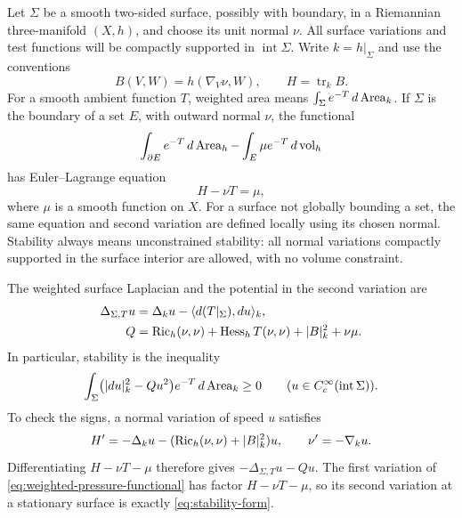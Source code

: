Let $\Sigma$ be a smooth two-sided surface, possibly with boundary, in a
Riemannian three-manifold $(X,h)$, and choose its unit normal $\nu$.
All surface variations and test functions will be compactly supported
in $\operatorname{int}\Sigma$.  Write $k=h|_\Sigma$ and use
the conventions
\[
 B(V,W)=h(\nabla_V\nu,W),\qquad H=\operatorname{tr}_k B.
\]
For a smooth ambient function $T$, weighted area means
$\int_\Sigma e^{-T}\,d\operatorname{Area}_k$.  If $\Sigma$ is the boundary of a set
$E$, with outward normal $\nu$, the functional
\begin{equation}\label{eq:weighted-pressure-functional}
 \int_{\partial E}e^{-T}\,d\operatorname{Area}_h
 -\int_E\mu e^{-T}\,d\operatorname{vol}_h
\end{equation}
has Euler--Lagrange equation
\begin{equation}\label{eq:weighted-mean-curvature}
 H-\nu T=\mu,
\end{equation}
where $\mu$ is a smooth function on $X$.  For a surface not globally
bounding a set, the same equation and second variation are defined
locally using its chosen normal.  Stability always means unconstrained
stability: all normal variations compactly supported in the surface
interior are allowed, with no volume constraint.

The weighted surface Laplacian and the potential in the second variation
are
\begin{equation}\label{eq:weighted-jacobi}
 \begin{split}
 \Delta_{\Sigma,T}u
   &=\Delta_ku-\langle d(T|_\Sigma),du\rangle_k,\\
 Q&=\operatorname{Ric}_h(\nu,\nu)+\operatorname{Hess}_hT(\nu,\nu)+|B|_k^2+\nu\mu.
 \end{split}
\end{equation}
In particular, stability is the inequality
\begin{equation}\label{eq:stability-form}
 \int_\Sigma\bigl(|du|_k^2-Qu^2\bigr)e^{-T}\,d\operatorname{Area}_k\ge0
 \qquad(u\in C_c^\infty(\operatorname{int}\Sigma)).
\end{equation}
To check the signs, a normal variation of speed $u$ satisfies
\[
 H'=-\Delta_ku-(\operatorname{Ric}_h(\nu,\nu)+|B|_k^2)u,
 \qquad \nu'=-\nabla_ku.
\]
Differentiating $H-\nu T-\mu$ therefore gives
$-\Delta_{\Sigma,T}u-Qu$.  The first variation of
\eqref{eq:weighted-pressure-functional} has factor $H-\nu T-\mu$,
so its second variation at a stationary surface is exactly
\eqref{eq:stability-form}.

